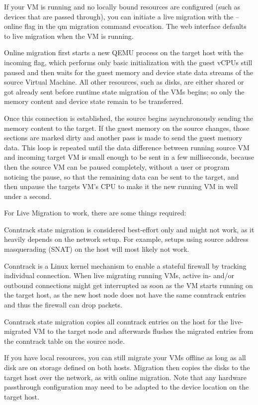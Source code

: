 If your VM is running and no locally bound resources are configured (such as devices that are passed through), you can initiate a live migration with the --online flag in the qm migration command evocation. The web interface defaults to live migration when the VM is running.

Online migration first starts a new QEMU process on the target host with the incoming flag, which performs only basic initialization with the guest vCPUs still paused and then waits for the guest memory and device state data streams of the source Virtual Machine. All other resources, such as disks, are either shared or got already sent before runtime state migration of the VMs begins; so only the memory content and device state remain to be transferred.

Once this connection is established, the source begins asynchronously sending the memory content to the target. If the guest memory on the source changes, those sections are marked dirty and another pass is made to send the guest memory data. This loop is repeated until the data difference between running source VM and incoming target VM is small enough to be sent in a few milliseconds, because then the source VM can be paused completely, without a user or program noticing the pause, so that the remaining data can be sent to the target, and then unpause the targets VM’s CPU to make it the new running VM in well under a second.

For Live Migration to work, there are some things required:

Conntrack state migration is considered best-effort only and might not work, as it heavily depends on the network setup. For example, setups using source address masquerading (SNAT) on the host will most likely not work.

Conntrack is a Linux kernel mechanism to enable a stateful firewall by tracking individual connection. When live migrating running VMs, active in- and/or outbound connections might get interrupted as soon as the VM starts running on the target host, as the new host node does not have the same conntrack entries and thus the firewall can drop packets.

Conntrack state migration copies all conntrack entries on the host for the live-migrated VM to the target node and afterwards flushes the migrated entries from the conntrack table on the source node.

If you have local resources, you can still migrate your VMs offline as long as all disk are on storage defined on both hosts. Migration then copies the disks to the target host over the network, as with online migration. Note that any hardware passthrough configuration may need to be adapted to the device location on the target host.

